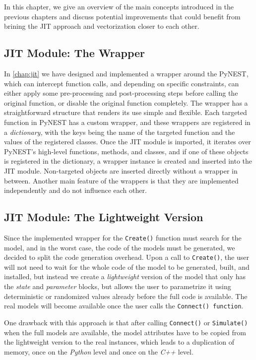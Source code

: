 In this chapter, we give an overview of the main concepts introduced in the previous chapters and discuss potential improvements that could benefit from brining the JIT approach and vectorization closer to each other.

\subsection*{JIT Module: The Wrapper}

In \autoref{chap:jit} we have designed and implemented a wrapper around the PyNEST, which can intercept function calls, and depending on specific constraints, can either apply some pre-processing and post-processing steps before calling the original function, or disable the original function completely. The wrapper has a straightforward structure that renders its use simple and flexible. Each targeted function in PyNEST has a custom wrapper, and these wrappers are registered in a \emph{dictionary,} with the keys being the name of the targeted function and the values of the registered classes. Once the JIT module is imported, it iterates over PyNEST's high-level functions, methods, and classes, and if one of these objects is registered in the dictionary, a wrapper instance is created and inserted into the JIT module. Non-targeted objects are inserted directly without a wrapper in between. Another main feature of the wrappers is that they are implemented independently and do not influence each other.

\subsection*{JIT Module: The Lightweight Version}

Since the implemented wrapper for the \texttt{Create()} function must search for the model, and in the worst case, the code of the models must be generated, we decided to split the code generation overhead. Upon a call to \texttt{Create()}, the user will not need to wait for the whole code of the model to be generated, built, and installed, but instead we create a \emph{lightweight} version of the model that only has the \emph{state} and \emph{parameter} blocks, but allows the user to parametrize it using deterministic or randomized values already before the full code is available. The real models will become available once the user calls the \texttt{Connect() function}.

One drawback with this approach is that after calling \texttt{Connect()} or \texttt{Simulate()} when the full models are available, the model attributes have to be copied from the lightweight version to the real instances, which leads to a duplication of memory, once on the \emph{Python} level and once on the \emph{C++} level.


